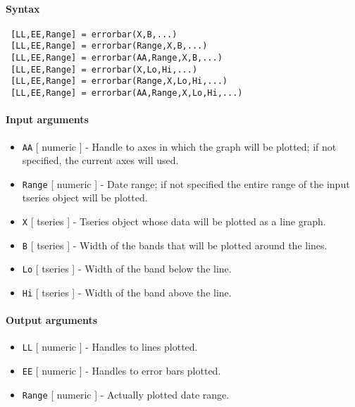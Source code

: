 


	\paragraph{Syntax}
 
 \begin{verbatim}
 [LL,EE,Range] = errorbar(X,B,...)
 [LL,EE,Range] = errorbar(Range,X,B,...)
 [LL,EE,Range] = errorbar(AA,Range,X,B,...)
 [LL,EE,Range] = errorbar(X,Lo,Hi,...)
 [LL,EE,Range] = errorbar(Range,X,Lo,Hi,...)
 [LL,EE,Range] = errorbar(AA,Range,X,Lo,Hi,...)
 \end{verbatim}
 
 \paragraph{Input arguments}
 
 \begin{itemize}
 \item
   \texttt{AA} {[} numeric {]} - Handle to axes in which the graph will
   be plotted; if not specified, the current axes will used.
 \item
   \texttt{Range} {[} numeric {]} - Date range; if not specified the
   entire range of the input tseries object will be plotted.
 \item
   \texttt{X} {[} tseries {]} - Tseries object whose data will be plotted
   as a line graph.
 \item
   \texttt{B} {[} tseries {]} - Width of the bands that will be plotted
   around the lines.
 \item
   \texttt{Lo} {[} tseries {]} - Width of the band below the line.
 \item
   \texttt{Hi} {[} tseries {]} - Width of the band above the line.
 \end{itemize}
 
 \paragraph{Output arguments}
 
 \begin{itemize}
 \item
   \texttt{LL} {[} numeric {]} - Handles to lines plotted.
 \item
   \texttt{EE} {[} numeric {]} - Handles to error bars plotted.
 \item
   \texttt{Range} {[} numeric {]} - Actually plotted date range.
 \end{itemize}
 
